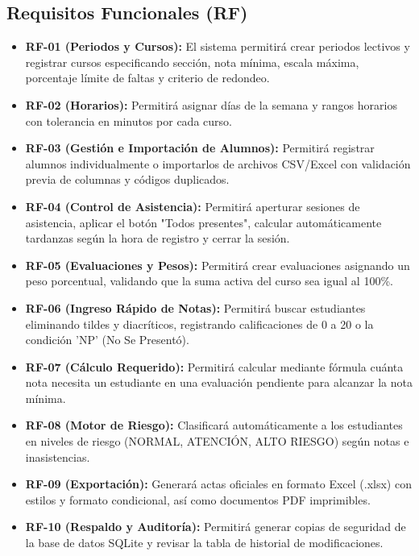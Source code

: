 \documentclass[12pt,a4paper]{article}
\begin{document}
\subsection{Requisitos Funcionales (RF)}
\begin{itemize}
    \item \textbf{RF-01 (Periodos y Cursos):} El sistema permitirá crear periodos lectivos y registrar cursos especificando sección, nota mínima, escala máxima, porcentaje límite de faltas y criterio de redondeo.
    \item \textbf{RF-02 (Horarios):} Permitirá asignar días de la semana y rangos horarios con tolerancia en minutos por cada curso.
    \item \textbf{RF-03 (Gestión e Importación de Alumnos):} Permitirá registrar alumnos individualmente o importarlos de archivos CSV/Excel con validación previa de columnas y códigos duplicados.
    \item \textbf{RF-04 (Control de Asistencia):} Permitirá aperturar sesiones de asistencia, aplicar el botón "Todos presentes", calcular automáticamente tardanzas según la hora de registro y cerrar la sesión.
    \item \textbf{RF-05 (Evaluaciones y Pesos):} Permitirá crear evaluaciones asignando un peso porcentual, validando que la suma activa del curso sea igual al 100\%.
    \item \textbf{RF-06 (Ingreso Rápido de Notas):} Permitirá buscar estudiantes eliminando tildes y diacríticos, registrando calificaciones de 0 a 20 o la condición 'NP' (No Se Presentó).
    \item \textbf{RF-07 (Cálculo Requerido):} Permitirá calcular mediante fórmula cuánta nota necesita un estudiante en una evaluación pendiente para alcanzar la nota mínima.
    \item \textbf{RF-08 (Motor de Riesgo):} Clasificará automáticamente a los estudiantes en niveles de riesgo (NORMAL, ATENCIÓN, ALTO RIESGO) según notas e inasistencias.
    \item \textbf{RF-09 (Exportación):} Generará actas oficiales en formato Excel (.xlsx) con estilos y formato condicional, así como documentos PDF imprimibles.
    \item \textbf{RF-10 (Respaldo y Auditoría):} Permitirá generar copias de seguridad de la base de datos SQLite y revisar la tabla de historial de modificaciones.
\end{itemize}
\end{document}
